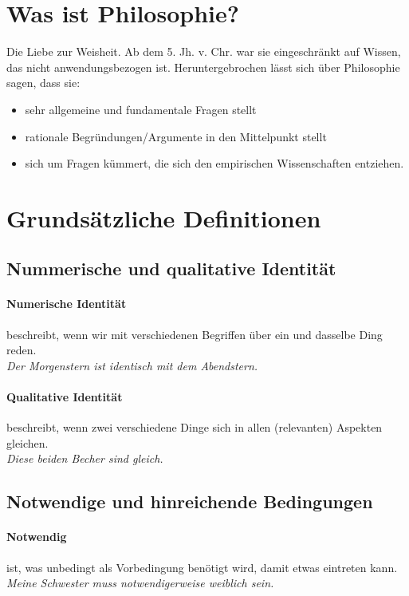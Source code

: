 \documentclass[../main.tex]{subfiles}
\begin{document}
\section{Was ist Philosophie?}
Die Liebe zur Weisheit. Ab dem 5. Jh. v. Chr. war sie eingeschränkt auf Wissen, das nicht anwendungsbezogen ist.
Heruntergebrochen lässt sich über Philosophie sagen, dass sie:
\begin{itemize}
  \item sehr allgemeine und fundamentale Fragen stellt
  \item rationale Begründungen/Argumente in den Mittelpunkt stellt
  \item sich um Fragen kümmert, die sich den empirischen Wissenschaften entziehen.
\end{itemize}

\section{Grundsätzliche Definitionen}

\subsection{Nummerische und qualitative Identität}\label{gD:numUndqualIdent}
\paragraph{Numerische Identität} beschreibt, wenn wir mit verschiedenen Begriffen über ein und dasselbe Ding reden. \\\textit{Der Morgenstern ist identisch mit dem Abendstern.} 
\paragraph{Qualitative Identität} beschreibt, wenn  zwei verschiedene Dinge sich in allen (relevanten) Aspekten gleichen. \\\textit{Diese beiden Becher sind gleich.}

\subsection{Notwendige und hinreichende Bedingungen}
\paragraph{Notwendig} ist, was unbedingt als Vorbedingung benötigt wird, damit etwas eintreten kann. \textit{Meine Schwester muss notwendigerweise weiblich sein.}
\end{document}
